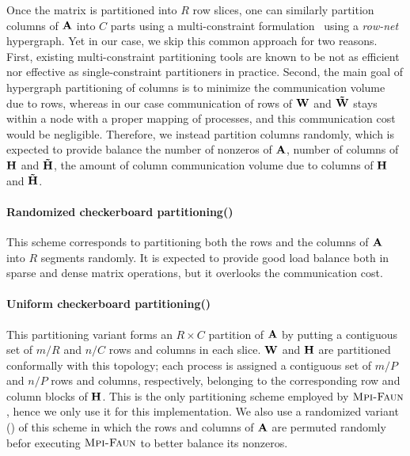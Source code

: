 Once the matrix is partitioned into $R$ row slices, one can similarly partition columns of $\mathbf{A}$ into $C$ parts using a multi-constraint formulation~\cite{aycu:08} using a \emph{row-net} hypergraph.
Yet in our case, we skip this common approach for two reasons.
First, existing multi-constraint partitioning tools are known to be not as efficient nor effective as single-constraint partitioners in practice.
Second, the main goal of hypergraph partitioning of columns is to minimize the communication volume due to rows, whereas in our case communication of rows of $\mathbf{W}$ and $\mathbf{\tilde{W}}$ stays within a node with a proper mapping of processes, and this communication cost would be negligible.
Therefore, we instead partition columns randomly, which is expected to provide balance the number of nonzeros of $\mathbf{A}$, number of columns of $\mathbf{H}$ and $\mathbf{\tilde{H}}$, the amount of column communication volume due to columns of $\mathbf{H}$ and $\mathbf{\tilde{H}}$.

\paragraph{Randomized checkerboard partitioning(\crp)}
This scheme corresponds to partitioning both the rows and the columns of $\mathbf{A}$ into $R$ segments randomly.
It is expected to provide good load balance both in sparse and dense matrix operations, but it overlooks the communication cost.

\paragraph{Uniform checkerboard partitioning(\unp)}
This partitioning variant forms an $R \times C$ partition of $\mathbf{A}$ by putting a contiguous set of $m / R$ and $n / C$ rows and columns in each slice.
$\mathbf{W}$ and $\mathbf{H}$ are partitioned conformally with this topology; each process is assigned a contiguous set of  $m / P$ and $n / P$ rows and columns, respectively, belonging to the corresponding row and column blocks of $\mathbf{H}$.
This is the only partitioning scheme employed by $\textsc{Mpi-Faun}$ \cite{KBP16, KBP16MPIFAUN}, hence we only use it for this implementation.
We also use a randomized variant (\urp) of this scheme in which the rows and columns of $\mathbf{A}$ are permuted randomly befor executing $\textsc{Mpi-Faun}$ to better balance its nonzeros.

